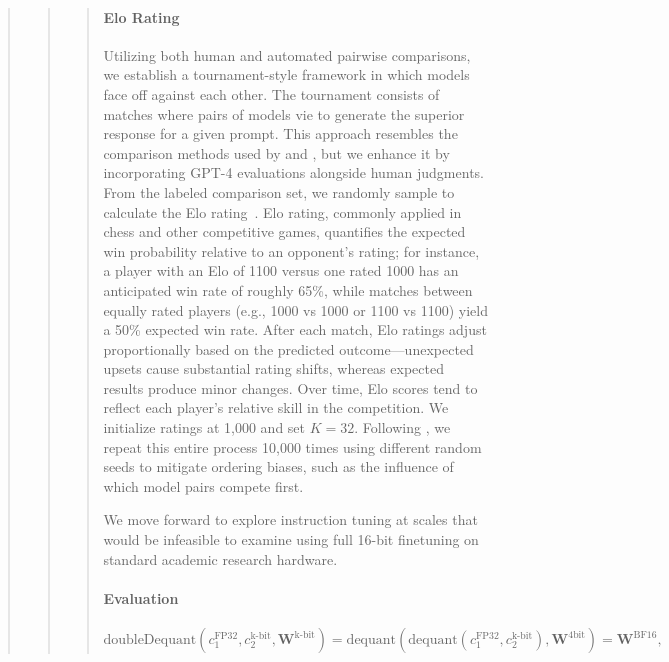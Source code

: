 \begin{quote}
\begin{quote}
\begin{quote}
\paragraph{Elo Rating} Utilizing both human and automated pairwise comparisons, we establish a tournament-style framework in which models face off against each other. The tournament consists of matches where pairs of models vie to generate the superior response for a given prompt. This approach resembles the comparison methods used by \citet{bai2022training} and \citet{vicuna2023}, but we enhance it by incorporating GPT-4 evaluations alongside human judgments. From the labeled comparison set, we randomly sample to calculate the Elo rating~\citep{elo1967proposed,elo1978rating}. Elo rating, commonly applied in chess and other competitive games, quantifies the expected win probability relative to an opponent's rating; for instance, a player with an Elo of 1100 versus one rated 1000 has an anticipated win rate of roughly 65\%, while matches between equally rated players (e.g., 1000 vs 1000 or 1100 vs 1100) yield a 50\% expected win rate. After each match, Elo ratings adjust proportionally based on the predicted outcome—unexpected upsets cause substantial rating shifts, whereas expected results produce minor changes. Over time, Elo scores tend to reflect each player's relative skill in the competition. We initialize ratings at 1,000 and set $K=32$. Following \citet{vicuna2023}, we repeat this entire process 10,000 times using different random seeds to mitigate ordering biases, such as the influence of which model pairs compete first.

We move forward to explore instruction tuning at scales that would be infeasible to examine using full 16-bit finetuning on standard academic research hardware.

\paragraph{Evaluation}

\begin{equation}
    \text{doubleDequant}(c_1^{\text{FP32}}, c_2^{\text{k-bit}}, \mathbf{W}^{\text{k-bit}}) = \text{dequant}(\text{dequant}(c_1^{\text{FP32}}, c_2^{\text{k-bit}}), \mathbf{W}^{\text{4bit}}) = \mathbf{W}^{\text{BF16}},
\end{equation}


\end{quote}
\end{quote}
\end{quote}
